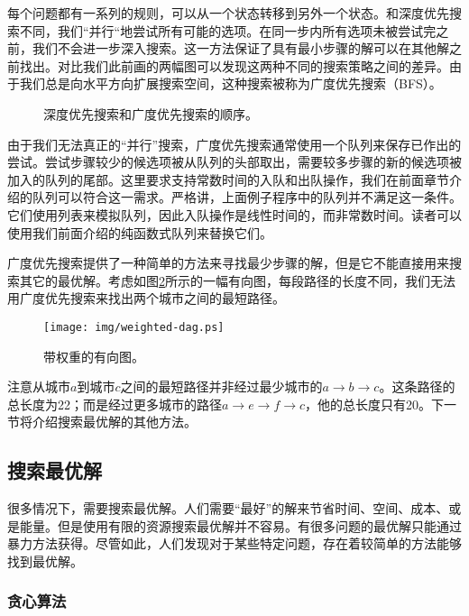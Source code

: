 \documentclass[UTF8]{article}
\begin{document}
每个问题都有一系列的规则，可以从一个状态转移到另外一个状态。和深度优先搜索不同，我们“并行“地尝试所有可能的选项。在同一步内所有选项未被尝试完之前，我们不会进一步深入搜索。这一方法保证了具有最小步骤的解可以在其他解之前找出。对比我们此前画的两幅图可以发现这两种不同的搜索策略之间的差异。由于我们总是向水平方向扩展搜索空间，这种搜索被称为广度优先搜索（BFS）。

\begin{figure}[htbp]
 \centering
 \caption{深度优先搜索和广度优先搜索的顺序。}
 \label{fig:dfs-bfs-tree}
\end{figure}

由于我们无法真正的“并行”搜索，广度优先搜索通常使用一个队列来保存已作出的尝试。尝试步骤较少的候选项被从队列的头部取出，需要较多步骤的新的候选项被加入的队列的尾部。这里要求支持常数时间的入队和出队操作，我们在前面章节介绍的队列可以符合这一需求。严格讲，上面例子程序中的队列并不满足这一条件。它们使用列表来模拟队列，因此入队操作是线性时间的，而非常数时间。读者可以使用我们前面介绍的纯函数式队列来替换它们。

广度优先搜索提供了一种简单的方法来寻找最少步骤的解，但是它不能直接用来搜索其它的最优解。考虑如图\ref{fig:weighted-dag}所示的一幅有向图，每段路径的长度不同，我们无法用广度优先搜索来找出两个城市之间的最短路径。

\begin{figure}[htbp]
 \centering
 \texttt{[image: img/weighted-dag.ps]}
 \caption{带权重的有向图。}
 \label{fig:weighted-dag}
\end{figure}

注意从城市$a$到城市$c$之间的最短路径并非经过最少城市的$a \to b \to c$。这条路径的总长度为22；而是经过更多城市的路径$a \to e \to f \to c$，他的总长度只有20。下一节将介绍搜索最优解的其他方法。

\subsection{搜索最优解}

很多情况下，需要搜索最优解。人们需要“最好”的解来节省时间、空间、成本、或是能量。但是使用有限的资源搜索最优解并不容易。有很多问题的最优解只能通过暴力方法获得。尽管如此，人们发现对于某些特定问题，存在着较简单的方法能够找到最优解。

\subsubsection{贪心算法}
\end{document}

